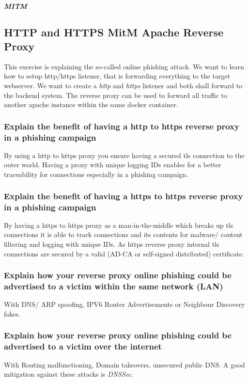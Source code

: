 \subparagraph{MITM}

\subsection{HTTP and HTTPS MitM Apache Reverse Proxy}
This exercise is explaining the so-called online phishing attack. We want to learn how to setup http/https listener, that is forwarding everything to the target webserver. We want to create a \textit{http} and \textit{https} listener and both shall forward to the backend system. The reverse proxy can be used to forward all traffic to another apache instance within the same docker container.

\subsubsection{Explain the benefit of having a http to https reverse proxy in a phishing campaign}
By using a http to https proxy you ensure having a secured tls connection to the outer world. Having a proxy with unique logging IDs enables for a better traceability for connections especially in a phishing campaign.

\subsubsection{Explain the benefit of having a https to https reverse proxy in a phishing campaign}
By having a https to https proxy as a man-in-the-middle which breaks up tls connections it is able to track connections and its contents for malware/ content filtering and logging with unique IDs. As https reverse proxy internal tls connections are secured by a valid (AD-CA or self-signed distributed) certificate.

\subsubsection{Explain how your reverse proxy online phishing could be advertised to a victim within the same network (LAN)}
With DNS/ ARP spoofing, IPV6 Router Advertisements or Neighbour Discovery fakes.

\subsubsection{Explain how your reverse proxy online phishing could be advertised to a victim over the internet}
With Routing malfunctioning, Domain takeovers, unsecured public DNS. A good mitigation against these attacks is \textit{DNSSec}.


